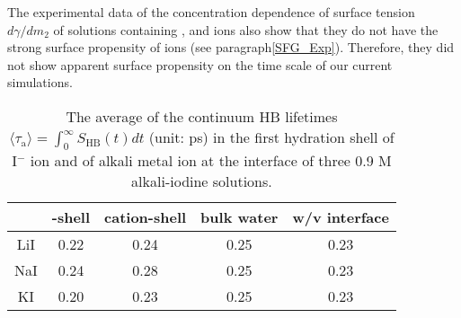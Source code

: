 The experimental data of the concentration dependence of surface tension $d\gamma/dm_2$ of solutions 
containing \Li, \Na and \K ions also show that they do not have the strong surface propensity of \I ions (see paragraph\thinspace\ref{SFG_Exp}).
Therefore, they did not show apparent surface propensity on the time scale of our current simulations.

%
\begin{table}[H]
\centering
\caption{\label{tab:tau_hb_alkali_iodine} 
The average of the continuum HB lifetimes $\langle\tau_{\text{a}}\rangle=\int_0^\infty S_\text{HB}(t) dt$ (unit: ps) in the first hydration shell of I$^-$ ion 
and of alkali metal ion at the interface of three 0.9 M alkali-iodine solutions.
}
\begin{tabular}{ccccc}
  &\I-shell &cation-shell & bulk water & w/v interface \\
\hline
 LiI & 0.22 & 0.24 & 0.25 & 0.23\\
 NaI & 0.24 & 0.28 & 0.25 & 0.23\\
 KI  & 0.20 & 0.23 & 0.25 &0.23\\
\end{tabular}
\end{table} 

